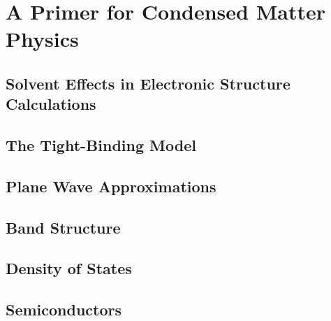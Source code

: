 \chapter{A Primer for Condensed Matter Physics}

\section{Solvent Effects in Electronic Structure Calculations}

\section{The Tight-Binding Model}
\section{Plane Wave Approximations}
\section{Band Structure}

\section{Density of States}

\section{Semiconductors}

